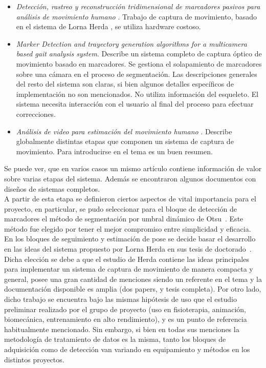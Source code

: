 \begin{itemize}
\begin{itemize}
		\item \emph{Detección, rastreo y reconstrucción tridimensional de marcadores pasivos para análisis de movimiento humano} \cite{colombianos}.	Trabajo de captura de movimiento, basado en el sistema de Lorna Herda \cite{herda}, se utiliza hardware costoso.
		\item \emph{Marker Detection and trayectory generation algorithms for a multicamera based gait analysis system}\cite{shafiq2001marker}.
		Describe un sistema completo de captura óptico de movimiento basado en marcadores.
		Se gestiona el solapamiento de marcadores sobre una cámara en el proceso de segmentación. Las descripciones generales del resto del sistema son claras, si bien algunos detalles específicos de implementación no son mencionados.
		No utiliza información del esqueleto. El sistema necesita interacción con el usuario al final del proceso para efectuar correcciones. 
		\item \emph{Análisis de video para estimación del movimiento humano} \cite{martinez2009analisis}. Describe globalmente distintas etapas que componen un sistema de captura de movimiento. Para introducirse en el tema es un buen resumen.
	\end{itemize}
\end{itemize}

Se puede ver, que en varios casos un mismo artículo contiene información de valor sobre varias etapas del sistema. Además se encontraron algunos documentos con diseños de sistemas completos.
\\ 

A partir de esta etapa se definieron ciertos aspectos de vital importancia para el proyecto, en particular, se pudo seleccionar para el bloque de detección de marcadores el método de segmentación por umbral dinámico de Otsu~\cite{otsu}. Este método fue elegido por tener el mejor compromiso entre simplicidad y eficacia.
\\ 

En los bloques de seguimiento y estimación de pose se decide basar el desarrollo en las ideas del sistema propuesto por Lorna Herda en sus tesis de doctorado~\cite{herda}. Dicha elección se debe a que el estudio de Herda contiene las ideas principales para implementar un sistema de captura de movimiento de manera compacta y general, posee una gran cantidad de menciones siendo un referente en el tema y la documentación disponible es amplia (dos papers, y tesis completa). Por otro lado, dicho trabajo se encuentra bajo las mismas hipótesis de uso que el estudio preliminar realizado por el grupo de proyecto (uso en fisioterapia, animación, biomecánica, entrenamiento en alto rendimiento), y es un punto de referencia habitualmente mencionado. Sin embargo, si bien en todas sus menciones la metodología de tratamiento de datos es la misma, tanto los bloques de adquisición como de detección van variando en equipamiento y métodos en los distintos proyectos.